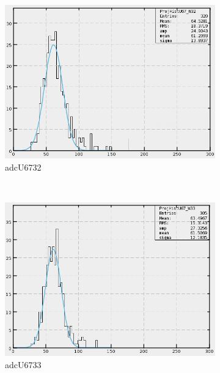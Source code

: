 \begin{figure}[h]
\begin{subfigure}[h]{0.3\textwidth}
        \includegraphics[width=\textwidth, keepaspectratio = true]{adcU67_32}
        \caption{adcU6732}
        \label{fig:adcU67_32}
    \end{subfigure}
    ~
    \begin{subfigure}[h]{0.3\textwidth}
        \centering
        \includegraphics[width=\textwidth, keepaspectratio = true]{adcU67_33}
        \caption{adcU6733}
        \label{fig:adcU67_33}
    \end{subfigure}
    ~
    \begin{subfigure}[h]{0.3\textwidth}
        \centering

\end{subfigure}
\end{figure}
